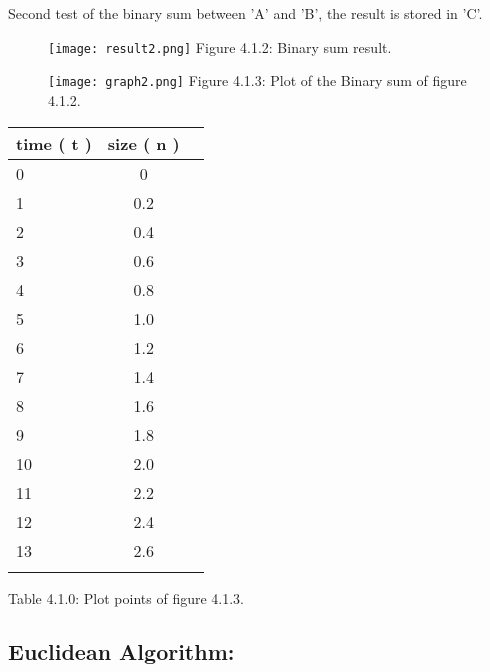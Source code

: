 \documentclass[10pt,a4paper]{article}
\begin{document}
\pagebreak

Second test of the binary sum between 'A' and 'B', the result is stored in 'C'.

\begin{figure}[H]
\texttt{[image: result2.png]}
\centering \linebreak \linebreak Figure 4.1.2: Binary sum result.
\end{figure}

\begin{multicols}{2}
\begin{figure}[H]
\texttt{[image: graph2.png]}
\centering \linebreak \linebreak Figure 4.1.3: Plot of the Binary sum of figure 4.1.2.
\end{figure}
\hfill \break

\begin{center}
\begin{tabular}[.5cm]{l c c }
\toprule
time ( t ) & size ( n ) \\
\midrule
0 & 0 \\
\cmidrule{1-2}
1 & 0.2 \\
\cmidrule{1-2}
2 & 0.4 \\
\cmidrule{1-2}
3 & 0.6 \\
\cmidrule{1-2}
4 & 0.8 \\
\cmidrule{1-2}
5 & 1.0 \\
\cmidrule{1-2}
6 & 1.2 \\
\cmidrule{1-2}
7 & 1.4 \\
\cmidrule{1-2}
8 & 1.6 \\
\cmidrule{1-2}
9 & 1.8 \\
\cmidrule{1-2}
10 & 2.0 \\
\cmidrule{1-2}
11 & 2.2 \\
\cmidrule{1-2}
12 & 2.4 \\
\cmidrule{1-2}
13 & 2.6 \\
\bottomrule
\linebreak
\end{tabular}
\centering \linebreak \linebreak Table 4.1.0: Plot points of figure 4.1.3.
\end{center}
\end{multicols}

\pagebreak

\subsection{Euclidean Algorithm:}
\end{document}
